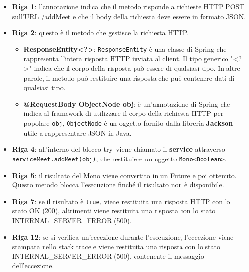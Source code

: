 \begin{itemize}
    \item \textbf{Riga 1}:
    l'annotazione indica che il metodo risponde a richieste HTTP POST sull'URL /addMeet 
    e che il body della richiesta deve essere in formato JSON.
  
    \item \textbf{Riga 2}:
    questo è il metodo che gestisce la richiesta HTTP. 
        \begin{itemize}
            \item \textbf{ResponseEntity\textless{}?{}\textgreater{}}: \texttt{ResponseEntity} è una classe di Spring che 
            rappresenta l'intera risposta HTTP inviata al client. Il tipo generico "\textless{}?\textgreater{}" indica che il corpo 
            della risposta può essere di qualsiasi tipo. In altre parole, il metodo può restituire una risposta che può 
            contenere dati di qualsiasi tipo.
            
            \item \textbf{@RequestBody ObjectNode obj}: è un'annotazione di Spring che indica al framework di 
            utilizzare il corpo della richiesta HTTP per popolare \texttt{obj}, \texttt{ObjectNode} è un oggetto fornito 
            dalla libreria \textbf{Jackson} utile a rappresentare JSON in Java.
            
        \end{itemize}
  
    \item \textbf{Riga 4}:
    all'interno del blocco try, viene chiamato il \textbf{service} attraverso
    \texttt{serviceMeet.addMeet(obj)}, che restituisce un oggetto 
    \texttt{Mono\textless{}Boolean\textgreater{}}. 
  
    \item \textbf{Riga 5}:
    il risultato del Mono viene convertito in un Future e poi ottenuto. Questo metodo blocca l'esecuzione 
    finché il risultato non è disponibile.
  
    \item \textbf{Riga 7}:
    se il risultato è \texttt{true}, viene restituita una risposta HTTP con lo stato OK (200), altrimenti
    viene restituita una risposta con lo stato INTERNAL_SERVER_ERROR (500).
  
    \item \textbf{Riga 12}:
    se si verifica un'eccezione durante l'esecuzione, l'eccezione viene stampata nello stack trace e viene 
    restituita una risposta con lo stato INTERNAL_SERVER_ERROR (500), contenente il messaggio dell'eccezione.
  \end{itemize}
